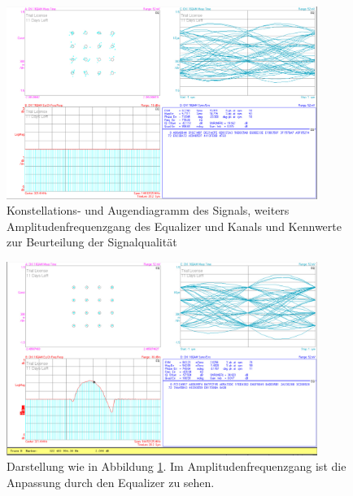 \documentclass[12pt,a4paper,ngerman]{article}
\begin{document}
\pagebreak
\begin{figure}[H]
\centering
\includegraphics[width=0.9\textwidth]{figures/Aufgabe3_16QAM_demod.jpg} 
\caption{Konstellations- und Augendiagramm des Signals, weiters Amplitudenfrequenzgang des Equalizer und Kanals und Kennwerte zur Beurteilung der Signalqualität}\label{fig:aufg2_16QAM_demod}
\end{figure}

\begin{figure}[H]
\centering
\includegraphics[width=0.9\textwidth]{figures/Aufgabe2_16QAM_demod_equal.jpg} 
\caption{Darstellung wie in Abbildung \ref{fig:aufg2_16QAM_demod}. Im Amplitudenfrequenzgang ist die Anpassung durch den Equalizer zu sehen. }\label{fig:aufg2_16QAM_demod_equal}
\end{figure}
\end{document}
